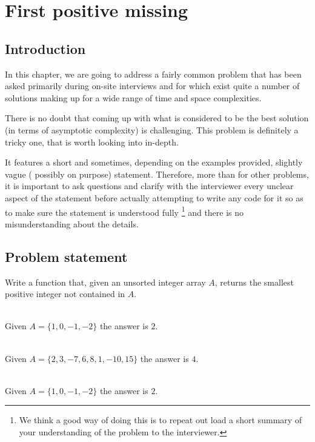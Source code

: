 %

\chapter{First positive missing}
\label{ch:first_positive_missing}
\section*{Introduction}
In this chapter, we are going to address a fairly common problem that has been asked primarily during on-site interviews and for which exist quite a number of solutions making up for a wide range of time and space complexities.

There is no doubt that coming up with what is considered to be the best solution (in terms of asymptotic complexity) is challenging. This problem is definitely a tricky one, that is worth looking into in-depth.

It features a short and sometimes, depending on the examples provided, slightly vague ( possibly on purpose) statement.
Therefore, more than for other problems, it is important to ask questions and clarify with the interviewer every unclear aspect of the statement before actually attempting to write any code for it so as to make sure the statement is understood fully \footnote{ We think a good way of doing this is to repeat out load a short summary of your understanding of the problem to the interviewer.} and there is no misunderstanding about the details.

\section{Problem statement}
\begin{exercise}
	Write a function that, given an unsorted integer array $A$, returns the smallest positive
	integer not contained in $A$.
	
	\begin{example}
		\hfill \\
		Given $A=\{ 1, 0, -1, -2\}$ the answer is $2$.
	\end{example}
	
	\begin{example}
		\hfill \\
		Given $A=\{ 2, 3, -7, 6, 8, 1, -10, 15\}$ the answer is $4$.
	\end{example}
	
	\begin{example}
		\hfill \\
		Given $A=\{ 1, 0, -1, -2\}$ the answer is $2$.
	\end{example}
\end{exercise}
	
